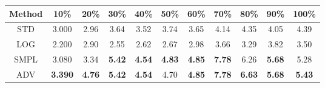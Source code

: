 \documentclass{standalone}
\begin{document}
\begin{tabular}{c|cccccccccc}
      \toprule
      Method & 10\% & 20\% & 30\% & 40\% & 50\% & 60\% & 70\% & 80\% & 90\% & 100\% \\
      \midrule
STD & 3.000 & 2.96 & 3.64 & 3.52 & 3.74 & 3.65 & 4.14 & 4.35 & 4.05 & 4.39\\
LOG & 2.200 & 2.90 & 2.55 & 2.62 & 2.67 & 2.98 & 3.66 & 3.29 & 3.82 & 3.50\\
SMPL & 3.080 & 3.34 & \textbf{5.42} & \textbf{4.54} & \textbf{4.83} & \textbf{4.85} & \textbf{7.78} & 6.26 & \textbf{5.68} & 5.28\\
ADV & \textbf{3.390} & \textbf{4.76} & \textbf{5.42} & \textbf{4.54} & 4.70 & \textbf{4.85} & \textbf{7.78} & \textbf{6.63} & \textbf{5.68} & \textbf{5.43}\\
  \bottomrule
\end{tabular}
\end{document}
